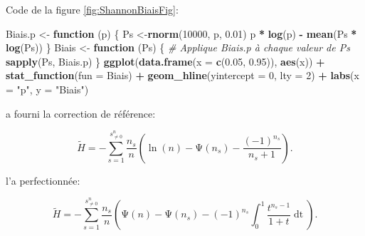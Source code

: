 \documentclass[
  11pt,
  french,
  a4paper,
  extrafontsizes,onecolumn,openright
  ]{memoir}
\newenvironment{Shaded}{\begin{snugshade}}{\end{snugshade}}
\newcommand{\CommentTok}[1]{\textcolor[rgb]{0.56,0.35,0.01}{\textit{#1}}}
\newcommand{\ControlFlowTok}[1]{\textcolor[rgb]{0.13,0.29,0.53}{\textbf{#1}}}
\newcommand{\DataTypeTok}[1]{\textcolor[rgb]{0.13,0.29,0.53}{#1}}
\newcommand{\DecValTok}[1]{\textcolor[rgb]{0.00,0.00,0.81}{#1}}
\newcommand{\FloatTok}[1]{\textcolor[rgb]{0.00,0.00,0.81}{#1}}
\newcommand{\KeywordTok}[1]{\textcolor[rgb]{0.13,0.29,0.53}{\textbf{#1}}}
\newcommand{\NormalTok}[1]{#1}
\newcommand{\OperatorTok}[1]{\textcolor[rgb]{0.81,0.36,0.00}{\textbf{#1}}}
\newcommand{\StringTok}[1]{\textcolor[rgb]{0.31,0.60,0.02}{#1}}
\begin{document}
\normalsize

Code de la figure \ref{fig:ShannonBiaisFig}:

\scriptsize

\begin{Shaded}
\begin{Highlighting}[]
\NormalTok{Biais.p <-}\StringTok{ }\ControlFlowTok{function}\NormalTok{ (p) \{}
\NormalTok{    Ps <-}\KeywordTok{rnorm}\NormalTok{(}\DecValTok{10000}\NormalTok{, p, }\FloatTok{0.01}\NormalTok{)}
\NormalTok{    p }\OperatorTok{*}\StringTok{ }\KeywordTok{log}\NormalTok{(p) }\OperatorTok{-}\StringTok{ }\KeywordTok{mean}\NormalTok{(Ps }\OperatorTok{*}\StringTok{ }\KeywordTok{log}\NormalTok{(Ps))}
\NormalTok{  \}}
\NormalTok{  Biais <-}\StringTok{ }\ControlFlowTok{function}\NormalTok{ (Ps) \{}
    \CommentTok{# Applique Biais.p à chaque valeur de Ps}
    \KeywordTok{sapply}\NormalTok{(Ps, Biais.p)}
\NormalTok{  \}}
  \KeywordTok{ggplot}\NormalTok{(}\KeywordTok{data.frame}\NormalTok{(}\DataTypeTok{x =} \KeywordTok{c}\NormalTok{(}\FloatTok{0.05}\NormalTok{, }\FloatTok{0.95}\NormalTok{)), }\KeywordTok{aes}\NormalTok{(x)) }\OperatorTok{+}\StringTok{ }
\StringTok{    }\KeywordTok{stat_function}\NormalTok{(}\DataTypeTok{fun =}\NormalTok{ Biais) }\OperatorTok{+}
\StringTok{    }\KeywordTok{geom_hline}\NormalTok{(}\DataTypeTok{yintercept =} \DecValTok{0}\NormalTok{, }\DataTypeTok{lty =} \DecValTok{2}\NormalTok{) }\OperatorTok{+}
\StringTok{    }\KeywordTok{labs}\NormalTok{(}\DataTypeTok{x =} \StringTok{"p"}\NormalTok{, }\DataTypeTok{y =} \StringTok{"Biais"}\NormalTok{)}
\end{Highlighting}
\end{Shaded}

\normalsize

\textcite{Grassberger1988} a fourni la correction de référence:

\begin{equation}
  \label{eq:Grassberger1988}
  \tilde{H}
  = -\sum^{s^{n}_{\ne 0}}_{s=1}
  {\frac{n_s}{n}\left(\ln\left(n\right)-\mathrm{\Psi}\left(n_s\right)-\frac{{\left(-1\right)}^{n_s}}{n_s+1}\right)}.
\end{equation}

\textcite{Grassberger2003} l'a perfectionnée:

\begin{equation}
  \label{eq:Grassberger2003}
  \tilde{H} 
  = -\sum^{s^{n}_{\ne 0}}_{s=1}
    {\frac{n_s}{n} \left(\mathrm{\Psi}\left(n\right)-\mathrm{\Psi}\left(n_s\right)-{\left(-1\right)}^{n_s}\int^1_0{\frac{t^{n_s-1}}{1+t}\mathop{dt}}\right)}.
\end{equation}
\end{document}
